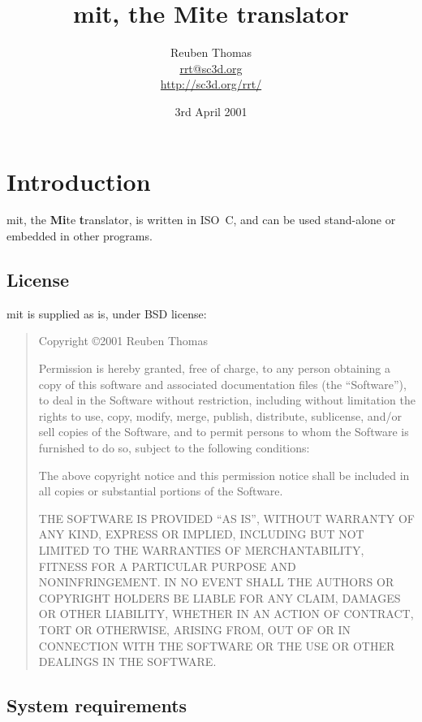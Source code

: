 \documentclass[english]{scrartcl}
\begin{document}
\title{mit, the Mite translator}
\author{Reuben Thomas\\\url{rrt@sc3d.org}\\\url{http://sc3d.org/rrt/}}
\date{3rd April 2001}
\maketitle



\section{Introduction}

mit, the \textbf{Mi}te \textbf{t}ranslator, is written in ISO~C, and can be
used stand-alone or embedded in other programs.


\subsection{License}

mit is supplied as is, under BSD license:

\begin{quote}
Copyright \copyright 2001 Reuben Thomas

Permission is hereby granted, free of charge, to any person obtaining
a copy of this software and associated documentation files (the
``Software''), to deal in the Software without restriction, including
without limitation the rights to use, copy, modify, merge, publish,
distribute, sublicense, and/or sell copies of the Software, and to
permit persons to whom the Software is furnished to do so, subject to
the following conditions:

The above copyright notice and this permission notice shall be
included in all copies or substantial portions of the Software.

THE SOFTWARE IS PROVIDED ``AS IS'', WITHOUT WARRANTY OF ANY KIND,
EXPRESS OR IMPLIED, INCLUDING BUT NOT LIMITED TO THE WARRANTIES OF
MERCHANTABILITY, FITNESS FOR A PARTICULAR PURPOSE AND NONINFRINGEMENT.
IN NO EVENT SHALL THE AUTHORS OR COPYRIGHT HOLDERS BE LIABLE FOR ANY
CLAIM, DAMAGES OR OTHER LIABILITY, WHETHER IN AN ACTION OF CONTRACT,
TORT OR OTHERWISE, ARISING FROM, OUT OF OR IN CONNECTION WITH THE
SOFTWARE OR THE USE OR OTHER DEALINGS IN THE SOFTWARE.
\end{quote}


\subsection{System requirements}
\end{document}
